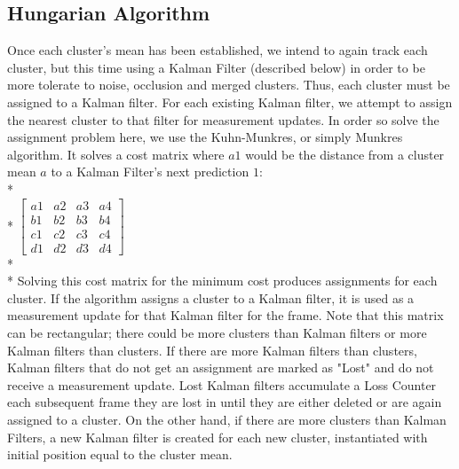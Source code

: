 \documentclass{article} %
\begin{document}
\subsection{Hungarian Algorithm}
Once each cluster's mean has been established, we intend to again track each cluster, but this time using a Kalman Filter (described below) in order to be more tolerate to noise, occlusion and merged clusters. Thus, each cluster must be assigned to a Kalman filter. For each existing Kalman filter, we attempt to assign the nearest cluster to that filter for measurement updates. In order so solve the assignment problem here, we use the Kuhn-Munkres, or simply Munkres algorithm. \cite{munkres1957algorithms} It solves a cost matrix where $a1$ would be the distance from a cluster mean $a$ to a Kalman Filter's next prediction $1$:\\*\\*
$\begin{bmatrix}
a1 & a2 & a3 & a4\\
b1 & b2 & b3 & b4\\
c1 & c2 & c3 & c4\\
d1 & d2 & d3 & d4\end{bmatrix}$\\*\\*
Solving this cost matrix for the minimum cost produces assignments for each cluster. If the algorithm assigns a cluster to a Kalman filter, it is used as a measurement update for that Kalman filter for the frame. Note that this matrix can be rectangular; there could be more clusters than Kalman filters or more Kalman filters than clusters. If there are more Kalman filters than clusters, Kalman filters that do not get an assignment are marked as "Lost" and do not receive a measurement update. Lost Kalman filters accumulate a Loss Counter each subsequent frame they are lost in until they are either deleted or are again assigned to a cluster.  On the other hand, if there are more clusters than Kalman Filters, a new Kalman filter is created for each new cluster, instantiated with initial position equal to the cluster mean.
\end{document}
